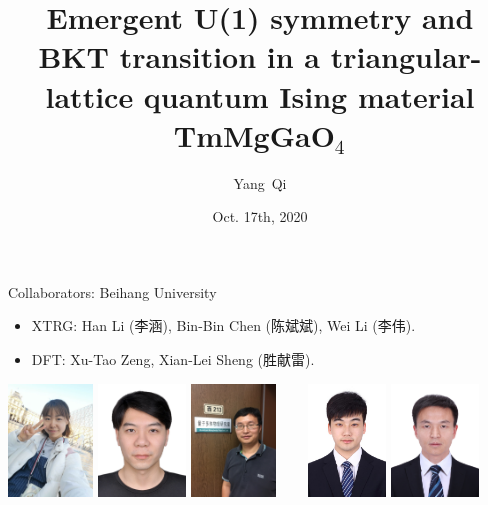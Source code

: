 \documentclass[xcolor=table, aspectratio=169,ignorenonframetext]{beamer}
\title %
{Emergent U(1) symmetry and BKT transition in a triangular-lattice quantum Ising material TmMgGaO${}_4$}
\author[Y Qi] %
{Yang~Qi}
\institute[Fudan] %
{
Department of Physics, Fudan University.
}
\date{Oct. 17th, 2020}
\begin{document}
\begin{frame}
  \titlepage
\end{frame}

\begin{frame}{Collaborators: Beihang University}
\begin{itemize}
	\item XTRG: Han Li (李涵), Bin-Bin Chen (陈斌斌), Wei Li (李伟).
	\item DFT: Xu-Tao Zeng, Xian-Lei Sheng (胜献雷).
\end{itemize}
	\begin{center}
		\includegraphics[height=3cm]{../people/hanli}
		\includegraphics[height=3cm]{../people/binbinchen}
		\includegraphics[height=3cm]{../people/weili}~~~~
		\includegraphics[height=3cm]{../people/xutaozeng}
		\includegraphics[height=3cm]{../people/xianleisheng}
	\end{center}
\end{frame}
\end{document}
